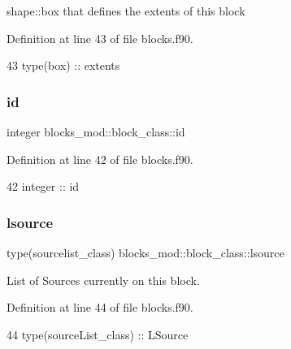 shape\+::box that defines the extents of this block 



Definition at line 43 of file blocks.\+f90.


\begin{DoxyCode}
43         \textcolor{keywordtype}{type}(box) :: extents
\end{DoxyCode}
\mbox{\label{structblocks__mod_1_1block__class_addd1a493d56aa1ffd1bc27c56b682065}} 
\subsubsection{\texorpdfstring{id}{id}}
{\footnotesize\ttfamily integer blocks\+\_\+mod\+::block\+\_\+class\+::id\hspace{0.3cm}{\ttfamily [private]}}



Definition at line 42 of file blocks.\+f90.


\begin{DoxyCode}
42         \textcolor{keywordtype}{integer} :: id
\end{DoxyCode}
\mbox{\label{structblocks__mod_1_1block__class_a2f4d63afb2696e2728f20a99e26a4b18}} 
\subsubsection{\texorpdfstring{lsource}{lsource}}
{\footnotesize\ttfamily type(sourcelist\+\_\+class) blocks\+\_\+mod\+::block\+\_\+class\+::lsource\hspace{0.3cm}{\ttfamily [private]}}



List of Sources currently on this block. 



Definition at line 44 of file blocks.\+f90.


\begin{DoxyCode}
44         \textcolor{keywordtype}{type}(sourceList\_class) :: LSource
\end{DoxyCode}
\mbox{\label{structblocks__mod_1_1block__class_ab4e2108886a09ba919d01474503f6165}} 
